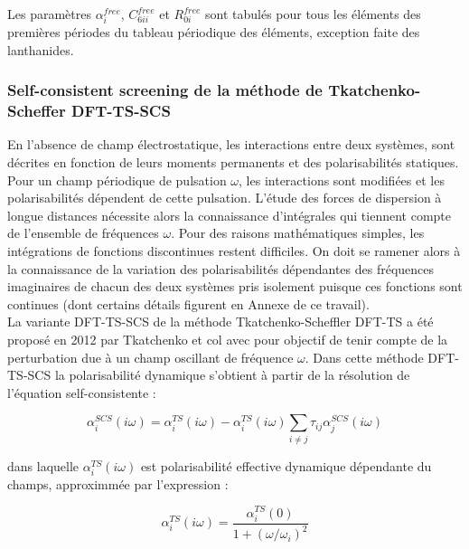Les paramètres $\alpha_{i}^{free}$, $C_{6ii}^{free}$ et $R_{0i}^{free}$ sont tabulés pour tous les éléments des premières périodes du tableau périodique des éléments, exception faite des lanthanides.


\subsubsection{Self-consistent screening de la méthode de Tkatchenko-Scheffer DFT-TS-SCS}

En l'absence de champ électrostatique, les interactions entre deux systèmes, sont décrites en fonction de leurs moments permanents et des polarisabilités statiques. Pour un champ périodique de pulsation $\omega$, les interactions sont modifiées et les polarisabilités dépendent de cette pulsation. L'étude des forces de dispersion à longue distances nécessite alors la connaissance d'intégrales qui tiennent compte de l'ensemble de fréquences $\omega$. Pour des raisons mathématiques simples, les intégrations de fonctions discontinues restent difficiles. On doit se ramener alors à la connaissance de la variation des polarisabilités dépendantes des fréquences imaginaires de chacun des deux systèmes pris isolement puisque ces fonctions sont continues (dont certains détails figurent en Annexe de ce travail). \\

La variante DFT-TS-SCS de la méthode Tkatchenko-Scheffler DFT-TS a été proposé en 2012 par Tkatchenko et col\cite{tkatchenko2012accurate} avec pour objectif de tenir compte de la perturbation due à un champ oscillant de fréquence $\omega$. Dans cette méthode DFT-TS-SCS la polarisabilité dynamique s'obtient à partir de la résolution de l’équation self-consistente :
	
\begin{equation}
\alpha_{i}^{SCS}(i \omega) = \alpha_{i}^{TS}(i \omega) - \alpha_{i}^{TS}(i \omega) \sum_{i\neq j} \tau_{ij} \alpha_{j}^{SCS}(i \omega)
\end{equation} 
	
dans laquelle $\alpha_{i}^{TS}(i \omega)$ est polarisabilité effective dynamique dépendante du champs, approximmée par l’expression : 
	
\begin{equation}
\alpha_{i}^{TS}(i \omega) = \frac{\alpha_{i}^{TS}(0)}{1 + (\omega/\omega_{i})^{2}}
\end{equation}
	
